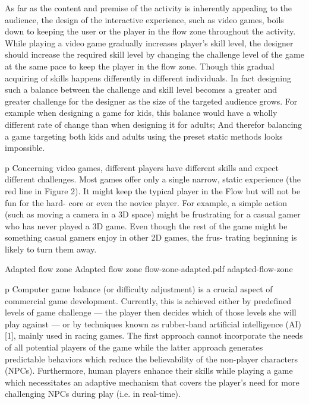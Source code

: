 As far as the content and premise of the activity is inherently appealing to the audience, the design of the interactive experience, such as video games, boils down to keeping the user or the player in the flow zone throughout the activity. While playing a video game gradually increases player's skill level, the designer should increase the required skill level by changing the challenge level of the game at the same pace to keep the player in the flow zone. Though this gradual acquiring of skills happens differently in different individuals. In fact designing such a balance between the challenge and skill level becomes a greater and greater challenge for the designer as the size of the targeted audience grows. For example when designing a game for kids, this balance would have a wholly different rate of change than when designing it for adults; And therefor balancing a game targeting both kids and adults using the preset static methods looks impossible.

p Concerning video games, different players have different skills and expect different challenges. Most games offer only a single narrow, static experience (the red line in Figure 2). It might keep the typical player in the Flow but will not be fun for the hard- core or even the novice player. For example, a simple action (such as moving a camera in a 3D space) might be frustrating for a casual gamer who has never played a 3D game. Even though the rest of the game might be something casual gamers enjoy in other 2D games, the frus- trating beginning is likely to turn them away. 

\img
{Adapted flow zone}
{Adapted flow zone}
{flow-zone-adapted.pdf}
{adapted-flow-zone}

p Computer game balance (or difficulty adjustment) is a crucial aspect of commercial game development. Currently, this is achieved either by predefined levels of game challenge — the player then decides which of those levels she will play against — or by techniques known as rubber-band artificial intelligence (AI) [1], mainly used in racing games. The first approach cannot incorporate the needs of all potential players of the game while the latter approach generates predictable behaviors which reduce the believability of the non-player characters (NPCs). Furthermore, human players enhance their skills while playing a game which necessitates an adaptive mechanism that covers the player’s need for more challenging NPCs during play (i.e. in real-time).

